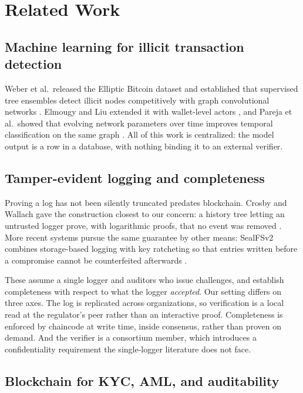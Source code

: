 \documentclass[conference]{IEEEtran}
\begin{document}
\section{Related Work}

\subsection{Machine learning for illicit transaction detection}

Weber et al.\ released the Elliptic Bitcoin dataset and established that
supervised tree ensembles detect illicit nodes competitively with graph
convolutional networks \cite{weber2019aml}. Elmougy and Liu extended it with
wallet-level actors \cite{elmougy2023ellipticpp}, and Pareja et al.\ showed that
evolving network parameters over time improves temporal classification on the
same graph \cite{pareja2020evolvegcn}. All of this work is centralized: the model output is a row in a database, with
nothing binding it to an external verifier.

\subsection{Tamper-evident logging and completeness}

Proving a log has not been silently truncated predates blockchain. Crosby and
Wallach gave the construction closest to our concern: a history tree letting an
untrusted logger prove, with logarithmic proofs, that no event was removed
\cite{crosby2009tamperevident}. More recent systems pursue the same guarantee by
other means: SealFSv2 combines storage-based logging with key ratcheting so that
entries written before a compromise cannot be counterfeited afterwards
\cite{guardiola2023sealfsv2}.

These assume a single logger and auditors who issue challenges, and establish
completeness with respect to what the logger \emph{accepted}. Our setting
differs on three axes. The log is replicated across organizations, so
verification is a local read at the regulator's peer rather than an interactive
proof. Completeness is enforced by chaincode at write time, inside consensus,
rather than proven on demand. And the verifier is a consortium member, which
introduces a confidentiality requirement the single-logger literature does not
face.

\subsection{Blockchain for KYC, AML, and auditability}
\end{document}
